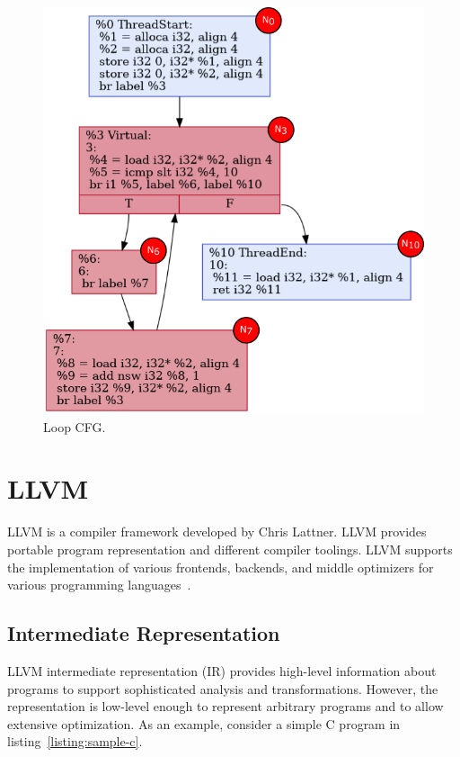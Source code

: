 \begin{figure}[htbp]
    \centerline{\includegraphics[scale=.70]{Figures/03/simple-loop-checkpoints.png}}
    \caption{Loop CFG.}
    \label{fig:simple-loop-checkpoints}
\end{figure}


\section{LLVM}
\label{sec:llvm}

LLVM is a compiler framework developed by Chris Lattner. LLVM provides portable
program representation and different compiler toolings. LLVM supports the
implementation of various frontends, backends, and middle optimizers for various
programming languages~\cite{lattnerLLVMCompilationFramework2004a}. 

\subsection{Intermediate Representation}

LLVM intermediate representation (IR) provides high-level information about
programs to support sophisticated analysis and transformations. However, the
representation is low-level enough to represent arbitrary programs and to allow
extensive optimization. As an example, consider a simple C program in
listing~\ref{listing:sample-c}.


